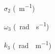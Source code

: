 \begin{enonce}
$\sigma_2$ (\SI{}{m^{-1}})
\end{enonce}






\begin{enonce}
	$\omega_3$ (\SI{}{rad \cdot s^{-1}})
	\end{enonce}
		
		
		


\begin{enonce}
$k_3$ (\SI{}{rad \cdot m^{-1}})
\end{enonce}





\finEntrainement







\hauteurLargeurCadreReponse		{6mm}{5cm}
\initialisationEntrainement

